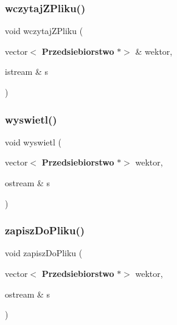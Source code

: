 \subsubsection{wczytaj\+Z\+Pliku()}
{\footnotesize\ttfamily void wczytaj\+Z\+Pliku (\begin{DoxyParamCaption}\item[{vector$<$ \textbf{ Przedsiebiorstwo} $\ast$$>$ \&}]{wektor,  }\item[{istream \&}]{s }\end{DoxyParamCaption})}

\mbox{\label{_program_8cpp_a959955090f660cec5f3e8b12f097a977}} 
\subsubsection{wyswietl()}
{\footnotesize\ttfamily void wyswietl (\begin{DoxyParamCaption}\item[{vector$<$ \textbf{ Przedsiebiorstwo} $\ast$$>$}]{wektor,  }\item[{ostream \&}]{s }\end{DoxyParamCaption})}

\mbox{\label{_program_8cpp_a7b8564cfb41b335ceca293e6f7539e14}} 
\subsubsection{zapisz\+Do\+Pliku()}
{\footnotesize\ttfamily void zapisz\+Do\+Pliku (\begin{DoxyParamCaption}\item[{vector$<$ \textbf{ Przedsiebiorstwo} $\ast$$>$}]{wektor,  }\item[{ostream \&}]{s }\end{DoxyParamCaption})}

